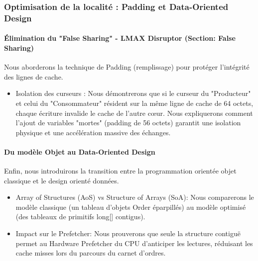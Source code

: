 \subsubsection{Optimisation de la localité : Padding et Data-Oriented Design}

\paragraph{Élimination du "False Sharing" - LMAX Disruptor (Section: False Sharing)}

Nous aborderons la technique de Padding (remplissage) pour protéger l'intégrité des lignes de cache.

\begin{itemize}
    \item Isolation des curseurs : Nous démontrerons que si le curseur du "Producteur" et celui du "Consommateur" résident sur la même ligne de cache de 64 octets, chaque écriture invalide le cache de l'autre cœur. Nous expliquerons comment l'ajout de variables "mortes" (padding de 56 octets) garantit une isolation physique et une accélération massive des échanges.
\end{itemize}

\paragraph{Du modèle Objet au Data-Oriented Design}

Enfin, nous introduirons la transition entre la programmation orientée objet classique et le design orienté données.

\begin{itemize}
    \item Array of Structures (AoS) vs Structure of Arrays (SoA): Nous comparerons le modèle classique (un tableau d'objets Order éparpillés) au modèle optimisé (des tableaux de primitifs long[] contigus).
    \item Impact sur le Prefetcher: Nous prouverons que seule la structure contiguë permet au Hardware Prefetcher du CPU d'anticiper les lectures, réduisant les cache misses lors du parcours du carnet d'ordres.
\end{itemize}